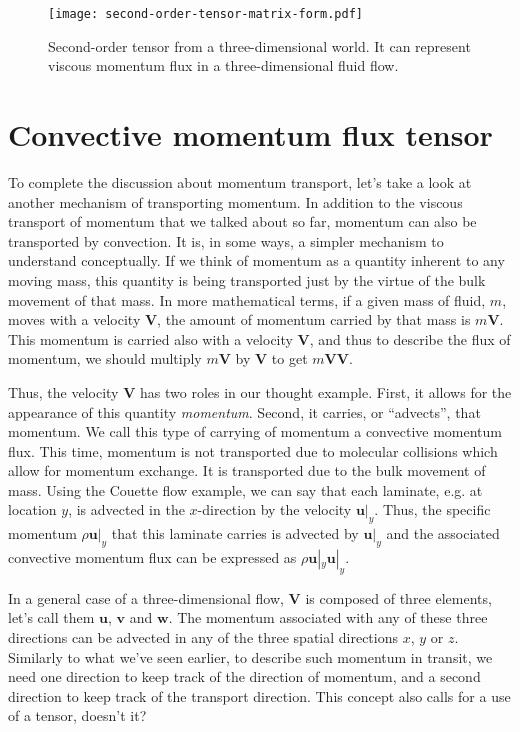\documentclass[10pt,twocolumn]{article}
\begin{document}
\begin{figure}[t!]
\centering\texttt{[image: second-order-tensor-matrix-form.pdf]}
\caption{Second-order tensor from a three-dimensional world. It can represent viscous momentum flux in a three-dimensional fluid flow.}
\label{fig:tensor-in-matrix-form}
\end{figure}

\section*{Convective momentum flux tensor}

To complete the discussion about momentum transport, let's take a look at another mechanism of transporting momentum. In addition to the viscous transport of momentum that we talked about so far, momentum can also be transported by convection. It is, in some ways, a simpler mechanism to understand conceptually. If we think of momentum as a quantity inherent to any moving mass, this quantity is being transported just by the virtue of the bulk movement of that mass. In more mathematical terms, if a given mass of fluid, $m$, moves with a velocity $\pmb{V}$, the amount of momentum carried by that mass is $m \pmb{V}$. This momentum is carried also with a velocity $\pmb{V}$, and thus to describe the flux of momentum, we should multiply $m \pmb{V}$ by $\pmb{V}$ to get $m \pmb{V} \pmb{V}$.

Thus, the velocity $\pmb{V}$ has two roles in our thought example. First, it allows for the appearance of this quantity \textit{momentum}. Second, it carries, or ``advects'', that momentum. We call this type of carrying of momentum a convective momentum flux. This time, momentum is not transported due to molecular collisions which allow for momentum exchange. It is transported due to the bulk movement of mass. Using the Couette flow example, we can say that each laminate, e.g. at location $y$, is advected in the $x$-direction by the velocity $\pmb{u}|_y$. Thus, the specific momentum $\rho \pmb{u}|_y$ that this laminate carries is advected by $\pmb{u}|_y$ and the associated convective momentum flux can be expressed as $\rho \pmb{u}|_y \pmb{u}|_y$.

In a general case of a three-dimensional flow, $\pmb{V}$ is composed of three elements, let's call them $\pmb{u}$, $\pmb{v}$ and $\pmb{w}$. The momentum associated with any of these three directions can be advected in any of the three spatial directions $x$, $y$ or $z$. Similarly to what we've seen earlier, to describe such momentum in transit, we need one direction to keep track of the direction of momentum, and a second direction to keep track of the transport direction. This concept also calls for a use of a tensor, doesn't it?
\end{document}

